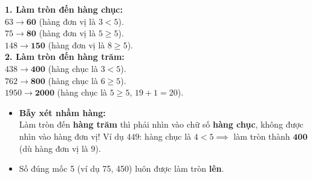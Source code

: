 \documentclass[11pt,a4paper]{article}
\begin{document}
\vspace{-2.5mm}
\noindent
\begin{minipage}[t]{0.49\textwidth}\vspace{0pt}
\begin{tcolorbox}[
  enhanced,
  colback=green!4!white,
  colframe=green!60!black,
  arc=2mm, boxrule=0.8pt,
  left=2mm, right=2mm, top=1.8mm, bottom=1.8mm,
  title={\footnotesize\bfseries\color{white}\faCheckCircle\ Ví dụ thực hành chuẩn mực}
]
{\footnotesize
\textbf{1. Làm tròn đến hàng chục:}\\
$63 \to \mathbf{60}$ (hàng đơn vị là $3 < 5$).\\
$75 \to \mathbf{80}$ (hàng đơn vị là $5 \ge 5$).\\
$148 \to \mathbf{150}$ (hàng đơn vị là $8 \ge 5$).\\
\textbf{2. Làm tròn đến hàng trăm:}\\
$438 \to \mathbf{400}$ (hàng chục là $3 < 5$).\\
$762 \to \mathbf{800}$ (hàng chục là $6 \ge 5$).\\
$1950 \to \mathbf{2000}$ (hàng chục là $5 \ge 5$, $19 + 1 = 20$).
}
\end{tcolorbox}
\end{minipage}
\hfill
\begin{minipage}[t]{0.49\textwidth}\vspace{0pt}
\begin{tcolorbox}[
  enhanced,
  colback=red!4!white,
  colframe=red!70!black,
  arc=2mm, boxrule=0.8pt,
  left=2mm, right=2mm, top=1.8mm, bottom=1.8mm,
  title={\footnotesize\bfseries\color{white}\faExclamationTriangle\ Mẹo tránh bẫy trắc nghiệm}
]
{\footnotesize
\begin{itemize}\setlength{\itemsep}{1.5pt}\setlength{\leftskip}{-2.5mm}
  \item \textbf{Bẫy xét nhầm hàng:}\\
  Làm tròn đến \textbf{hàng trăm} thì phải nhìn vào chữ số \textbf{hàng chục}, không được nhìn vào hàng đơn vị! Ví dụ $449$: hàng chục là $4 < 5 \implies$ làm tròn thành $\mathbf{400}$ (dù hàng đơn vị là $9$).
  \item Số đúng mốc 5 (ví dụ 75, 450) luôn được làm tròn \textbf{lên}.
\end{itemize}
}
\end{tcolorbox}
\end{minipage}
\end{document}
